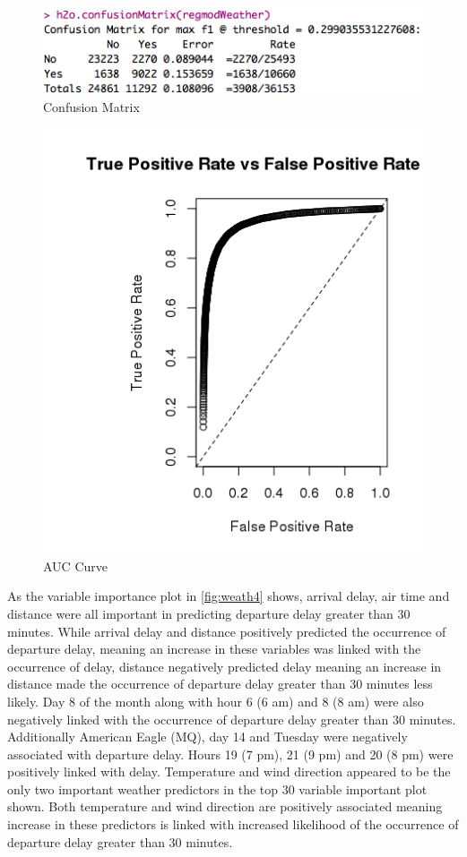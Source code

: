 \documentclass[12pt,twoside]{amherstthesis}
\begin{document}
  \begin{figure}[htbp]
  \centering
  \includegraphics[scale = 0.8,angle = 0]{figure/regModWeather2.png}
  \caption[Confusion Matrix]{\normalsize{Confusion Matrix}}
  \label{fig:weath2}
  \end{figure}
  
  \begin{figure}[htbp]
  \centering
  \includegraphics[scale = 0.8,angle = 0]{figure/AUCWeather.png}
  \caption[AUC Curve]{\normalsize{AUC Curve}}
  \label{fig:weath3}
  \end{figure}
  
  \clearpage
  
  As the variable importance plot in \autoref{fig:weath4} shows, arrival
  delay, air time and distance were all important in predicting departure
  delay greater than 30 minutes. While arrival delay and distance
  positively predicted the occurrence of departure delay, meaning an
  increase in these variables was linked with the occurrence of delay,
  distance negatively predicted delay meaning an increase in distance made
  the occurrence of departure delay greater than 30 minutes less likely.
  Day 8 of the month along with hour 6 (6 am) and 8 (8 am) were also
  negatively linked with the occurrence of departure delay greater than 30
  minutes. Additionally American Eagle (MQ), day 14 and Tuesday were
  negatively associated with departure delay. Hours 19 (7 pm), 21 (9 pm)
  and 20 (8 pm) were positively linked with delay. Temperature and wind
  direction appeared to be the only two important weather predictors in
  the top 30 variable important plot shown. Both temperature and wind
  direction are positively associated meaning increase in these predictors
  is linked with increased likelihood of the occurrence of departure delay
  greater than 30 minutes.
  
\end{document}
